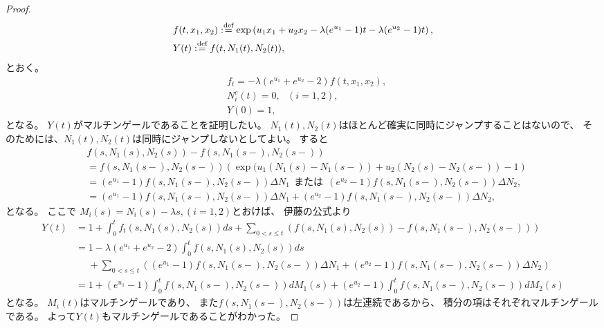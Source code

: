 \documentclass[uplatex]{jsarticle}
\theoremstyle{definition}
\def\dfn{:\overset{\mbox{{\scriptsize def}}}{=}}
\begin{document}
\begin{proof}
  \begin{align*}
    &f(t,x_1,x_2) \dfn \exp \left( u_1x_1 + u_2x_2
    - \lambda (e^{u_1}-1)t - \lambda (e^{u_2}-1)t\right), \\
    &Y(t) \dfn f(t,N_1(t),N_2(t)),
  \end{align*}
  とおく。
  \begin{align*}
    &f_t = - \lambda \left( e^{u_1} + e^{u_2} - 2 \right)f(t,x_1,x_2), \\
    &N_i^c(t) = 0, \ \ \ (i=1,2), \\
    &Y(0) = 1,
  \end{align*}
  となる。
  \(Y(t)\)がマルチンゲールであることを証明したい。
  \(N_1(t),N_2(t)\)はほとんど確実に同時にジャンプすることはないので、
  そのためには、\(N_1(t),N_2(t)\)は同時にジャンプしないとしてよい。
  すると
  \begin{align*}
    &f(s,N_1(s),N_2(s)) - f(s,N_1(s-),N_2(s-)) \\
    &= f(s,N_1(s-),N_2(s-))
    \left( \exp(u_1(N_1(s)-N_1(s-))+u_2(N_2(s)-N_2(s-)) - 1\right) \\
    &= (e^{u_1}-1)f(s,N_1(s-),N_2(s-))\Delta N_1 \ \ \text{または} \ \
    (e^{u_2}-1)f(s,N_1(s-),N_2(s-))\Delta N_2, \\
    &= (e^{u_1}-1)f(s,N_1(s-),N_2(s-))\Delta N_1
    + (e^{u_2}-1)f(s,N_1(s-),N_2(s-))\Delta N_2,
  \end{align*}
  となる。
  ここで
  \(M_i(s) = N_i(s) - \lambda s , (i=1,2)\)とおけば、
  伊藤の公式より
  \begin{align*}
    Y(t)
    &= 1 + \int_0^t f_t(s,N_1(s),N_2(s))ds
    + \sum_{0 < s \leq t}\left(
    f(s,N_1(s),N_2(s)) - f(s,N_1(s-),N_2(s-)) \right) \\
    &= 1 - \lambda \left( e^{u_1} + e^{u_2} - 2 \right)
    \int_0^t f(s,N_1(s),N_2(s)) ds \\
    &\ \ \ \ \ \
    + \sum_{0 < s \leq t} \left( (e^{u_1}-1)f(s,N_1(s-),N_2(s-))\Delta N_1
    + (e^{u_2}-1)f(s,N_1(s-),N_2(s-))\Delta N_2 \right) \\
    &= 1 + (e^{u_1}-1)\int_0^tf(s,N_1(s-),N_2(s-))dM_1(s)
    + (e^{u_2}-1)\int_0^tf(s,N_1(s-),N_2(s-))dM_2(s)
  \end{align*}
  となる。
  \(M_i(t)\)はマルチンゲールであり、
  また\(f(s,N_1(s-),N_2(s-))\)は左連続であるから、
  積分の項はそれぞれマルチンゲールである。
  よって\(Y(t)\)もマルチンゲールであることがわかった。


\end{proof}
\end{document}
